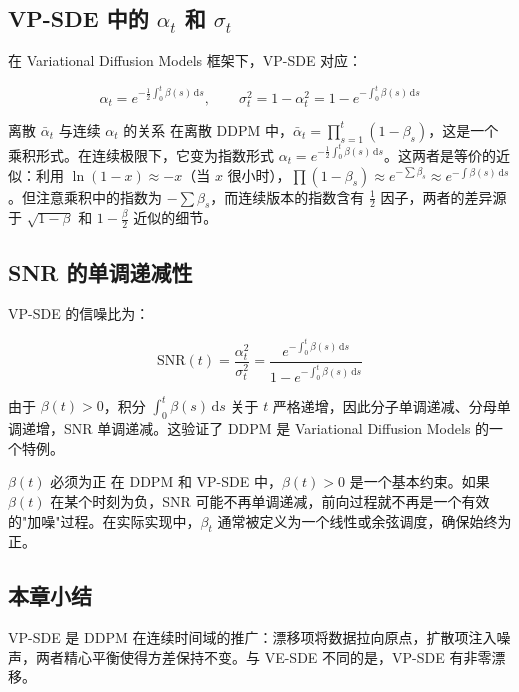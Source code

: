 \documentclass[a4paper]{article}
\begin{document}
\subsection{VP-SDE 中的 $\alpha_t$ 和 $\sigma_t$}

在 Variational Diffusion Models 框架下，VP-SDE 对应：

$$
\alpha_t = e^{-\frac{1}{2}\int_0^t \beta(s)\,\mathrm{d}s}, \qquad \sigma_t^2 = 1 - \alpha_t^2 = 1 - e^{-\int_0^t \beta(s)\,\mathrm{d}s}
$$

\begin{knowledgebox}{离散 $\bar{\alpha}_t$ 与连续 $\alpha_t$ 的关系}
在离散 DDPM 中，$\bar{\alpha}_t = \prod_{s=1}^t (1-\beta_s)$，这是一个乘积形式。在连续极限下，它变为指数形式 $\alpha_t = e^{-\frac{1}{2}\int_0^t \beta(s)\,\mathrm{d}s}$。这两者是等价的近似：利用 $\ln(1-x) \approx -x$（当 $x$ 很小时），$\prod(1-\beta_s) \approx e^{-\sum \beta_s} \approx e^{-\int \beta(s)\,\mathrm{d}s}$。但注意乘积中的指数为 $-\sum \beta_s$，而连续版本的指数含有 $\frac{1}{2}$ 因子，两者的差异源于 $\sqrt{1-\beta}$ 和 $1-\frac{\beta}{2}$ 近似的细节。
\end{knowledgebox}

\subsection{SNR 的单调递减性}

VP-SDE 的信噪比为：

$$
\mathrm{SNR}(t) = \frac{\alpha_t^2}{\sigma_t^2} = \frac{e^{-\int_0^t \beta(s)\,\mathrm{d}s}}{1 - e^{-\int_0^t \beta(s)\,\mathrm{d}s}}
$$

由于 $\beta(t) > 0$，积分 $\int_0^t \beta(s)\,\mathrm{d}s$ 关于 $t$ 严格递增，因此分子单调递减、分母单调递增，SNR 单调递减。这验证了 DDPM 是 Variational Diffusion Models 的一个特例。

\begin{warningbox}{$\beta(t)$ 必须为正}
在 DDPM 和 VP-SDE 中，$\beta(t) > 0$ 是一个基本约束。如果 $\beta(t)$ 在某个时刻为负，SNR 可能不再单调递减，前向过程就不再是一个有效的"加噪"过程。在实际实现中，$\beta_t$ 通常被定义为一个线性或余弦调度，确保始终为正。
\end{warningbox}

\subsection{本章小结}

VP-SDE 是 DDPM 在连续时间域的推广：漂移项将数据拉向原点，扩散项注入噪声，两者精心平衡使得方差保持不变。与 VE-SDE 不同的是，VP-SDE 有非零漂移。
\end{document}
